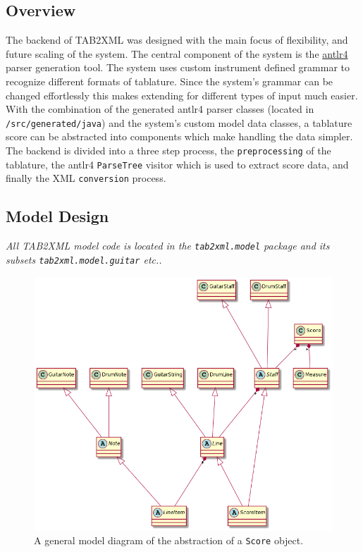 \documentclass[11pt]{article}
\begin{document}
\subsection{Overview}
\label{sec:orgb00dc15}
The backend of TAB2XML was designed with the main focus of flexibility, and future scaling of the system. The central component of the system is the \href{https://www.antlr.org/}{antlr4} parser generation tool. The system uses custom instrument defined grammar to recognize different formats of tablature. Since the system's grammar can be changed effortlessly this makes extending for different types of input much easier. With the combination of the generated antlr4 parser classes (located in \texttt{/src/generated/java}) and the system's custom model data classes, a tablature score can be abstracted into components which make handling the data simpler. The backend is divided into a three step process, the \texttt{preprocessing} of the tablature, the antlr4 \texttt{ParseTree} visitor which is used to extract score data, and finally the XML \texttt{conversion} process.

\subsection{Model Design}
\label{sec:org55b6b28}
\emph{All TAB2XML model code is located in the \texttt{tab2xml.model} package and its subsets \texttt{tab2xml.model.guitar} etc..}
\begin{figure}[htbp]
\centering
\includegraphics[width=.9\linewidth]{./Diagrams/backend-model-abstraction.png}
\caption{A general model diagram of the abstraction of a \texttt{Score} object.}
\end{figure}
\end{document}
